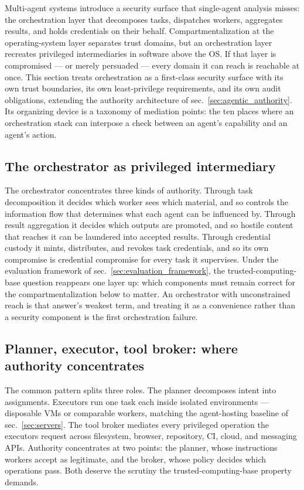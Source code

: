 \documentclass[
  english,
  9pt,
]{extarticle}
\begin{document}
Multi-agent systems introduce a security surface that single-agent
analysis misses: the orchestration layer that decomposes tasks,
dispatches workers, aggregates results, and holds credentials on their
behalf. Compartmentalization at the operating-system layer separates
trust domains, but an orchestration layer recreates privileged
intermediaries in software above the OS. If that layer is compromised
--- or merely persuaded --- every domain it can reach is reachable at
once. This section treats orchestration as a first-class security
surface with its own trust boundaries, its own least-privilege
requirements, and its own audit obligations, extending the authority
architecture of sec.~\ref{sec:agentic_authority}. Its organizing device
is a taxonomy of mediation points: the ten places where an orchestration
stack can interpose a check between an agent's capability and an agent's
action.

\subsection{The orchestrator as privileged
intermediary}\label{the-orchestrator-as-privileged-intermediary}

The orchestrator concentrates three kinds of authority. Through task
decomposition it decides which worker sees which material, and so
controls the information flow that determines what each agent can be
influenced by. Through result aggregation it decides which outputs are
promoted, and so hostile content that reaches it can be laundered into
accepted results. Through credential custody it mints, distributes, and
revokes task credentials, and so its own compromise is credential
compromise for every task it supervises. Under the evaluation framework
of sec.~\ref{sec:evaluation_framework}, the trusted-computing-base
question reappears one layer up: which components must remain correct
for the compartmentalization below to matter. An orchestrator with
unconstrained reach is that answer's weakest term, and treating it as a
convenience rather than a security component is the first orchestration
failure.

\subsection{Planner, executor, tool broker: where authority
concentrates}\label{planner-executor-tool-broker-where-authority-concentrates}

The common pattern splits three roles. The planner decomposes intent
into assignments. Executors run one task each inside isolated
environments --- disposable VMs or comparable workers, matching the
agent-hosting baseline of sec.~\ref{sec:servers}. The tool broker
mediates every privileged operation the executors request across
filesystem, browser, repository, CI, cloud, and messaging APIs.
Authority concentrates at two points: the planner, whose instructions
workers accept as legitimate, and the broker, whose policy decides which
operations pass. Both deserve the scrutiny the trusted-computing-base
property demands.
\end{document}
